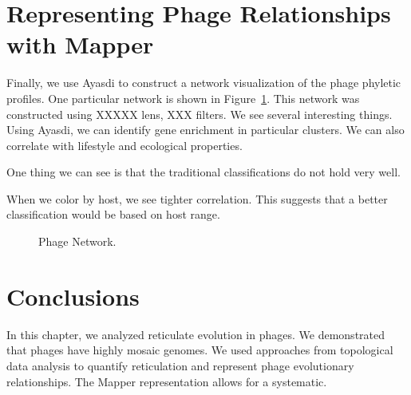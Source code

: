 \section{Representing Phage Relationships with Mapper}
\label{phage:mapper}

Finally, we use Ayasdi to construct a network visualization of the phage phyletic profiles.
One particular network is shown in Figure~\ref{phage:fig:network}.
This network was constructed using XXXXX lens, XXX filters.
We see several interesting things.
Using Ayasdi, we can identify gene enrichment in particular clusters.
We can also correlate with lifestyle and ecological properties.

One thing we can see is that the traditional classifications do not hold very well.

When we color by host, we see tighter correlation.
This suggests that a better classification would be based on host range.

\begin{figure}
\centering
\caption[Phage Network]{Phage Network.}
\label{phage:fig:network}
\end{figure}

\section{Conclusions}
\label{phage:sec:conclusions}

In this chapter, we analyzed reticulate evolution in phages.
We demonstrated that phages have highly mosaic genomes.
We used approaches from topological data analysis to quantify reticulation and represent phage evolutionary relationships.
The Mapper representation allows for a systematic.